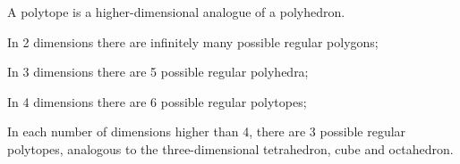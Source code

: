 A polytope is a higher-dimensional analogue of a polyhedron.
\par
In 2 dimensions there are infinitely many possible regular polygons;
\par
In 3 dimensions there are 5 possible regular polyhedra;
\par
In 4 dimensions there are 6 possible regular polytopes;
\par
In each number of dimensions higher than 4, there are
3 possible regular polytopes, analogous to the three-dimensional
tetrahedron, cube and octahedron.